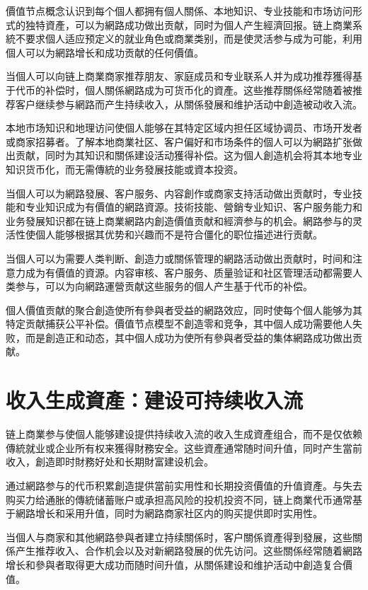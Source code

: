 \documentclass[
  Letterpaper,
]{scrbook}
\begin{document}
價值节点概念认识到每个個人都拥有個人關係、本地知识、专业技能和市场访问形式的独特資產，可以为網路成功做出贡献，同时为個人产生經濟回报。链上商業系統不要求個人适应预定义的就业角色或商業类别，而是使灵活参与成为可能，利用個人可以为網路增长和成功贡献的任何價值。

当個人可以向链上商業商家推荐朋友、家庭成员和专业联系人并为成功推荐獲得基于代币的补偿时，個人關係網路成为可货币化的資產。这些推荐關係经常随着被推荐客户继续参与網路而产生持续收入，从關係發展和维护活动中創造被动收入流。

本地市场知识和地理访问使個人能够在其特定区域内担任区域协调员、市场开发者或商家招募者。了解本地商業社区、客户偏好和市场条件的個人可以为網路扩张做出贡献，同时为其知识和關係建设活动獲得补偿。这为個人創造机会将其本地专业知识货币化，而无需傳統的业务發展技能或資本投资。

当個人可以为網路發展、客户服务、内容創作或商家支持活动做出贡献时，专业技能和专业知识成为有價值的網路資源。技術技能、營銷专业知识、客户服务能力和业务發展知识都在链上商業網路内創造價值贡献和經濟参与的机会。網路参与的灵活性使個人能够根据其优势和兴趣而不是符合僵化的职位描述进行贡献。

当個人可以为需要人类判断、創造力或關係管理的網路活动做出贡献时，时间和注意力成为有價值的資源。内容审核、客户服务、质量验证和社区管理活动都需要人类参与，可以为向網路運營贡献这些服务的個人产生基于代币的补偿。

個人價值贡献的聚合創造使所有參與者受益的網路效应，同时使每个個人能够为其特定贡献捕获公平补偿。價值节点模型不創造零和竞争，其中個人成功需要他人失败，而是創造正和动态，其中個人成功为使所有參與者受益的集体網路成功做出贡献。

\section{收入生成資產：建设可持续收入流}\label{ux6536ux5165ux751fux6210ux8cc7ux7522ux5efaux8bbeux53efux6301ux7eedux6536ux5165ux6d41}

链上商業参与使個人能够建设提供持续收入流的收入生成資產组合，而不是仅依赖傳統就业或企业所有权来獲得財務安全。这些資產通常随时间升值，同时产生當前收入，創造即时財務好处和长期財富建设机会。

通过網路参与的代币积累創造提供當前实用性和长期投资價值的升值資產。与失去购买力给通胀的傳統储蓄账户或承担高风险的投机投资不同，链上商業代币通常基于網路增长和采用升值，同时为網路商家社区内的购买提供即时实用性。

当個人与商家和其他網路參與者建立持续關係时，客户關係資產得到發展，这些關係产生推荐收入、合作机会以及对新網路發展的优先访问。这些關係经常随着網路增长和參與者取得更大成功而随时间升值，从關係建设和维护活动中創造复合價值。
\end{document}
